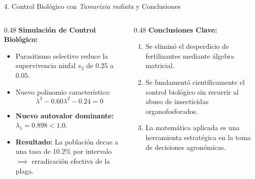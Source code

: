 \documentclass[
  spanish,
  aspectratio=169,
  xcolor={dvipsnames,table}
]{beamer}
\begin{document}
\begin{frame}{4. Control Biológico con \textit{Tamarixia radiata} y Conclusiones}
  \begin{columns}[T]
    \begin{column}{0.48\textwidth}
      \textbf{\color{uanlblue}Simulación de Control Biológico:}
      \begin{itemize}
        \item Parasitismo selectivo reduce la supervivencia ninfal $s_2$ de $0.25$ a $0.05$.
        \item Nuevo polinomio característico:
          $$\lambda^3 - 0.60\lambda^2 - 0.24 = 0$$
        \item \textbf{Nuevo autovalor dominante:} $\lambda_1 = 0.898 < 1.0$.
        \item \textbf{Resultado:} La población decae a una tasa de $10.2\%$ por intervalo $\implies$ erradicación efectiva de la plaga.
      \end{itemize}
    \end{column}
    \begin{column}{0.48\textwidth}
      \textbf{\color{uanlblue}Conclusiones Clave:}
      \begin{enumerate}
        \item Se eliminó el desperdicio de fertilizantes mediante álgebra matricial.
        \item Se fundamentó científicamente el control biológico sin recurrir al abuso de insecticidas organofosforados.
        \item La matemática aplicada es una herramienta estratégica en la toma de decisiones agronómicas.
      \end{enumerate}
    \end{column}
  \end{columns}
\end{frame}
\end{document}
